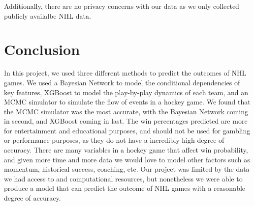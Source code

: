 \documentclass[11pt]{article}
\begin{document}
Additionally, there are no privacy concerns with our data as we only collected publicly availalbe NHL data.

\section{Conclusion}

In this project, we used three different methods to predict the outcomes of NHL games. We used a Bayesian Network to model the conditional dependencies of key features, XGBoost to model the play-by-play dynamics of each team, and an MCMC simulator to simulate the flow of events in a hockey game. We found that the MCMC simulator was the most accurate, with the Bayesian Network coming in second, and XGBoost coming in last. 
The win percentages predicted are more for entertainment and educational purposes, and should not be used for gambling or performance purposes, as they do not have a incredibly high degree of accuracy. There are many variables in a hockey game that affect win probability, and given more time and more data we would love to model other factors such as momentum, historical success, coaching, etc. Our project was limited by the data
we had access to and computational resources, but nonetheless we were able to produce a model that can predict the outcome of NHL games with a reasonable degree of accuracy.

\newpage


\end{document}
